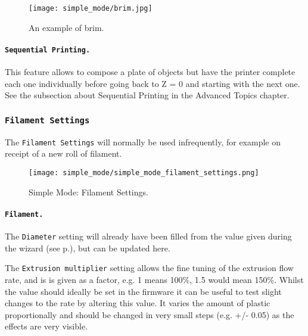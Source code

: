\begin{figure}[H]
\centering
\texttt{[image: simple\_mode/brim.jpg]}
\caption{An example of brim.}
\label{fig:an_example_of_brim}
\end{figure}


\paragraph{\texttt{Sequential Printing.}} %
\label{par:sequential_printing}
This feature allows to compose a plate of objects but have the printer complete each one individually before going back to Z = 0 and starting with the next one. See the subsection about Sequential Printing in the Advanced Topics chapter.


\subsubsection{\texttt{Filament Settings}}

The \texttt{Filament Settings} will normally be used infrequently, for example on receipt of a new roll of filament.

\begin{figure}[H]
\centering
\texttt{[image: simple\_mode/simple\_mode\_filament\_settings.png]}
\caption{Simple Mode: Filament Settings.}
\label{fig:simple_mode_filament_settings}
\end{figure}

\paragraph{\texttt{Filament.}} %
\label{par:filament}
The \texttt{Diameter} setting will already have been filled from the value given during the wizard (see p.\pageref{sub:4_filament_diameter}), but can be updated here.

The \texttt{Extrusion multiplier} setting allows the fine tuning of the extrusion flow rate, and is is given as a factor, e.g. 1 means 100\%, 1.5 would mean 150\%.  Whilst the value should ideally be set in the firmware it can be useful to test slight changes to the rate by altering this value.  It varies the amount of plastic proportionally and should be changed in very small steps (e.g. +/- 0.05) as the effects are very visible.

